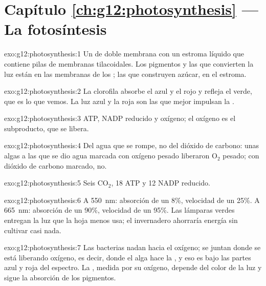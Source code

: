 \section*{Capítulo \ref{ch:g12:photosynthesis} --- La fotosíntesis}

\begin{solution}{exo:g12:photosynthesis:1}
Un  de doble membrana con un estroma líquido que contiene pilas
de membranas tilacoidales. Los pigmentos y las  que convierten
la luz están en las membranas de los ; las  que
construyen azúcar, en el estroma.
\end{solution}

\begin{solution}{exo:g12:photosynthesis:2}
La clorofila absorbe el azul y el rojo y refleja el verde, que es lo
que vemos. La luz azul y la roja son las que mejor impulsan la
.
\end{solution}

\begin{solution}{exo:g12:photosynthesis:3}
ATP, NADP reducido y oxígeno; el oxígeno es el subproducto, que se
libera.
\end{solution}

\begin{solution}{exo:g12:photosynthesis:4}
Del agua que se rompe, no del dióxido de carbono: unas algas a las que
se dio agua marcada con oxígeno pesado liberaron $\mathrm{O_2}$ pesado;
con dióxido de carbono marcado, no.
\end{solution}

\begin{solution}{exo:g12:photosynthesis:5}
Seis $\mathrm{CO_2}$, 18 ATP y 12 NADP reducido.
\end{solution}

\begin{solution}{exo:g12:photosynthesis:6}
A \qty{550}{nm}: absorción de un 8\%, velocidad de un 25\%. A
\qty{665}{nm}: absorción de un 90\%, velocidad de un 95\%. Las lámparas
verdes entregan la luz que la hoja menos usa; el invernadero ahorraría
energía sin cultivar casi nada.
\end{solution}

\begin{solution}{exo:g12:photosynthesis:7}
Las bacterias nadan hacia el oxígeno; se juntan donde se está liberando
oxígeno, es decir, donde el alga hace la , y eso es bajo
las partes azul y roja del espectro. La , medida por su
oxígeno, depende del color de la luz y sigue la absorción de los
pigmentos.
\end{solution}

